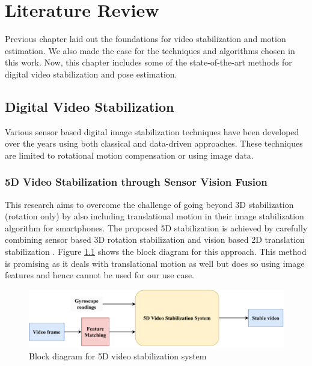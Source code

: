 \chapter{Literature Review} \label{chapter_three}

Previous chapter laid out the foundations for video stabilization and motion estimation. We also made the case for the techniques and algorithms chosen in this work. Now, this chapter includes some of the state-of-the-art methods for digital video stabilization and pose estimation. 

\section{Digital Video Stabilization}
Various sensor based digital image stabilization techniques have been developed over the years using both classical and data-driven approaches. These techniques are limited to rotational motion compensation or using image data.

\subsection{5D Video Stabilization through Sensor Vision Fusion}
This research aims to overcome the challenge of going beyond 3D stabilization (rotation only) by also including translational motion in their image stabilization algorithm for smartphones. The proposed 5D stabilization is achieved by carefully combining sensor based 3D rotation stabilization and vision based 2D translation stabilization \citep{zhuang20195d}. Figure \ref{fig:5d_stab} shows the block diagram for this approach. This method is promising as it deals with translational motion as well but does so using image features and hence cannot be used for our use case.

\begin{figure}[H]
    \centering
    \includegraphics[scale=0.65]{images/fig_chapter3/5d_stab.pdf}
    \caption{Block diagram for 5D video stabilization system} 
    \label{fig:5d_stab}
\end{figure}

